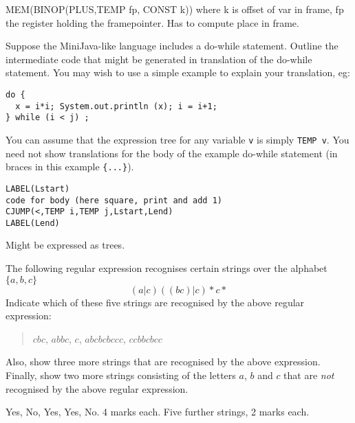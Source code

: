 \documentclass[11pt]{bareexam}
\begin{document}
\begin{questions}
\begin{subquestions}
\begin{subsubquestions}
\begin{modelanswer}
MEM(BINOP(PLUS,TEMP fp, CONST k)) where k is offset of var in frame, fp the
register holding the framepointer. Has to compute place in frame.
\end{modelanswer}

\subsubquestion
Suppose the MiniJava-like language includes a do-while statement.
Outline the intermediate code that might be generated
in translation of the do-while statement. You may wish to use a simple
example to explain your translation, eg:
\begin{verbatim}
do { 
  x = i*i; System.out.println (x); i = i+1;
} while (i < j) ;
\end{verbatim}
You can assume that the expression tree for any variable \verb"v" is
simply \verb"TEMP v". You need not show translations for the body of the
example do-while statement (in braces in this example \verb+{...}+).

\begin{modelanswer}
\begin{verbatim}
LABEL(Lstart)
code for body (here square, print and add 1)
CJUMP(<,TEMP i,TEMP j,Lstart,Lend)
LABEL(Lend)
\end{verbatim}
Might be expressed as trees.
\end{modelanswer}

\end{subsubquestions}
\end{subquestions}

\newpage

\question

\begin{subquestions}

\subquestion
The following regular expression recognises certain strings over the
alphabet $\{a,b,c\}$
\[
(a|c)((bc)|c)\!*c*
\]
Indicate which of these five strings are recognised by the above regular expression:
\begin{quote}
$cbc$, $abbc$, $c$, $abcbcbccc$, $ccbbcbcc$
\end{quote}
Also, show three more strings that are recognised by the above expression.
Finally, show two more strings consisting of 
the letters $a$, $b$ and $c$ that are \emph{not} 
recognised by the above regular expression.

\begin{modelanswer}
Yes, No, Yes, Yes, No. 4 marks each. 
Five further strings, 2 marks each.
\end{modelanswer}


\end{subquestions}
\end{questions}
\end{document}
